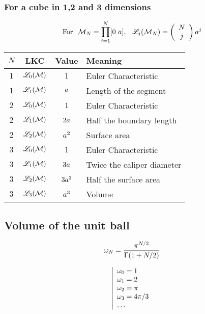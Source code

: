 \documentclass[a4paper,12pt]{article}
\begin{document}
\subsubsection{For a cube in 1,2 and 3 dimensions}
\begin{equation}
  \text{For} \ \ \MRF_N=\prod_{i=1}^{N}[0\ \Msize], \ \ \LKC_j(\MRF_N)= \left( \begin{array}{c} N \\ j \end{array} \right) \Msize^j
\end{equation}
\begin{center}
  \begin{tabular}{c|c|c|l}
    $N$ & LKC & Value & Meaning \\
    \hline
    $1$ & $\mathscr{L}_0(\mathcal{M})$ & $1$ & Euler Characteristic \\
    $1$ & $\mathscr{L}_1(\mathcal{M})$ & $a$ & Length of the segment \\
    \hline
    $2$ & $\mathscr{L}_0(\mathcal{M})$ & $1$ & Euler Characteristic \\
    $2$ & $\mathscr{L}_1(\mathcal{M})$ & $2a$ & Half the boundary length \\
    $2$ & $\mathscr{L}_2(\mathcal{M})$ & $a^2$ & Surface area \\
    \hline
    $3$ & $\mathscr{L}_0(\mathcal{M})$ & $1$ & Euler Characteristic \\
    $3$ & $\mathscr{L}_1(\mathcal{M})$ & $3a$ & Twice the caliper diameter \\
    $3$ & $\mathscr{L}_2(\mathcal{M})$ & $3a^2$ & Half the surface area \\
    $3$ & $\mathscr{L}_3(\mathcal{M})$ & $a^3$ & Volume \\
  \end{tabular}
\end{center}

\subsection{Volume of the unit ball}
\begin{minipage}{0.5\linewidth}
\begin{equation}\omega_N=\frac{\pi^{N/2}}{\Gamma(1+N/2)}\end{equation}
\end{minipage}
\begin{minipage}{0.5\linewidth}
\begin{equation}
  \left|
  \begin{array}{l}
    \omega_0=1 \\
    \omega_1=2 \\
    \omega_2=\pi \\
    \omega_3=4\pi/3 \\
    \dots
  \end{array}
  \right.
\end{equation}
\end{minipage}
\end{document}
